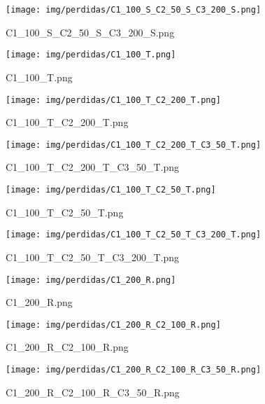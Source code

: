 \begin{figure}[H]
    \centerline{\texttt{[image: img/perdidas/C1\_100\_S\_C2\_50\_S\_C3\_200\_S.png]}}
    \caption{C1_100_S_C2_50_S_C3_200_S.png}
    \label{fig:C1_100_S_C2_50_S_C3_200_S.png}
\end{figure}

\begin{figure}[H]
    \centerline{\texttt{[image: img/perdidas/C1\_100\_T.png]}}
    \caption{C1_100_T.png}
    \label{fig:C1_100_T.png}
\end{figure}

\begin{figure}[H]
    \centerline{\texttt{[image: img/perdidas/C1\_100\_T\_C2\_200\_T.png]}}
    \caption{C1_100_T_C2_200_T.png}
    \label{fig:C1_100_T_C2_200_T.png}
\end{figure}

\begin{figure}[H]
    \centerline{\texttt{[image: img/perdidas/C1\_100\_T\_C2\_200\_T\_C3\_50\_T.png]}}
    \caption{C1_100_T_C2_200_T_C3_50_T.png}
    \label{fig:C1_100_T_C2_200_T_C3_50_T.png}
\end{figure}

\begin{figure}[H]
    \centerline{\texttt{[image: img/perdidas/C1\_100\_T\_C2\_50\_T.png]}}
    \caption{C1_100_T_C2_50_T.png}
    \label{fig:C1_100_T_C2_50_T.png}
\end{figure}

\begin{figure}[H]
    \centerline{\texttt{[image: img/perdidas/C1\_100\_T\_C2\_50\_T\_C3\_200\_T.png]}}
    \caption{C1_100_T_C2_50_T_C3_200_T.png}
    \label{fig:C1_100_T_C2_50_T_C3_200_T.png}
\end{figure}

\begin{figure}[H]
    \centerline{\texttt{[image: img/perdidas/C1\_200\_R.png]}}
    \caption{C1_200_R.png}
    \label{fig:C1_200_R.png}
\end{figure}

\begin{figure}[H]
    \centerline{\texttt{[image: img/perdidas/C1\_200\_R\_C2\_100\_R.png]}}
    \caption{C1_200_R_C2_100_R.png}
    \label{fig:C1_200_R_C2_100_R.png}
\end{figure}

\begin{figure}[H]
    \centerline{\texttt{[image: img/perdidas/C1\_200\_R\_C2\_100\_R\_C3\_50\_R.png]}}
    \caption{C1_200_R_C2_100_R_C3_50_R.png}
    \label{fig:C1_200_R_C2_100_R_C3_50_R.png}
\end{figure}


